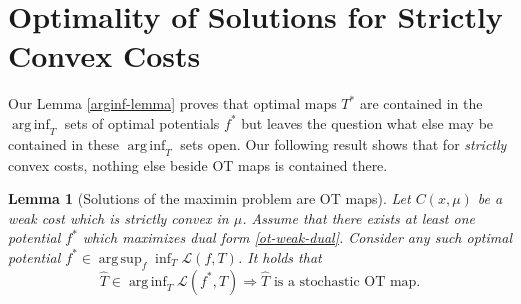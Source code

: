 \documentclass{article} %
\newtheorem{lemma}{Lemma}
\DeclareMathOperator*{\argsup}{arg\,sup}
\DeclareMathOperator*{\arginf}{arg\,inf}
\begin{document}

\section{Optimality of Solutions for Strictly Convex Costs}
\label{sec-strictly-convex}

Our Lemma \ref{arginf-lemma} proves that optimal maps $T^{*}$ are contained in the $\arginf_{T}$ sets of optimal potentials $f^{*}$ but leaves the question what else may be contained in these $\arginf_{T}$ sets open. Our following result shows that for \textit{strictly} convex costs, nothing else beside OT maps is contained there.

\begin{lemma}[Solutions of the maximin problem are OT maps] Let $C(x,\mu)$ be a weak cost which is \textit{strictly} convex in $\mu$. Assume that there exists at least one potential $f^{*}$ which maximizes dual form \eqref{ot-weak-dual}. Consider any such optimal potential $f^{*}\in\argsup_{f}\inf_{T}\mathcal{L}(f,T)$. It holds that $$\hat{T}\in\arginf_{T}\mathcal{L}(f^{*},T)\Rightarrow \hat{T}\mbox{ is a stochastic OT map}.$$
\label{arginf-lemma-inverse}
\end{lemma}
\end{document}
